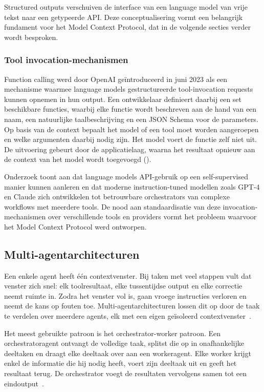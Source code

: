 Structured outputs verschuiven de interface van een language model van vrije tekst naar een getypeerde API. Deze conceptualisering vormt een belangrijk fundament voor het Model Context Protocol, dat in de volgende secties verder wordt besproken.

\subsubsection{Tool invocation-mechanismen}

Function calling werd door OpenAI geïntroduceerd in juni 2023 als een mechanisme waarmee language models gestructureerde tool-invocation requests kunnen opnemen in hun output. Een ontwikkelaar definieert daarbij een set beschikbare functies, waarbij elke functie wordt beschreven aan de hand van een naam, een natuurlijke taalbeschrijving en een JSON Schema voor de parameters. Op basis van de context bepaalt het model of een tool moet worden aangeroepen en welke argumenten daarbij nodig zijn. Het model voert de functie zelf niet uit. De uitvoering gebeurt door de applicatielaag, waarna het resultaat opnieuw aan de context van het model wordt toegevoegd (\cite{schick2023toolformer}).

Onderzoek toont aan dat language models API-gebruik op een self-supervised manier kunnen aanleren en dat moderne instruction-tuned modellen zoals GPT-4 en Claude zich ontwikkelen tot betrouwbare orchestrators van complexe workflows met meerdere tools. De nood aan standaardisatie van deze invocation-mechanismen over verschillende tools en providers vormt het probleem waarvoor het Model Context Protocol werd ontworpen.

\subsection{Multi-agentarchitecturen}\label{subsec:multi-agent}

Een enkele agent heeft één contextvenster. Bij taken met veel stappen vult dat venster zich snel: elk toolresultaat, elke tussentijdse output en elke correctie neemt ruimte in. Zodra het venster vol is, gaan vroege instructies verloren en neemt de kans op fouten toe. Multi-agentarchitecturen lossen dit op door de taak te verdelen over meerdere agents, elk met een eigen geïsoleerd contextvenster~\cite{cemri2025multiagentfail}.

Het meest gebruikte patroon is het orchestrator-worker patroon. Een orchestratoragent ontvangt de volledige taak, splitst die op in onafhankelijke deeltaken en draagt elke deeltaak over aan een workeragent. Elke worker krijgt enkel de informatie die hij nodig heeft, voert zijn deeltaak uit en geeft het resultaat terug. De orchestrator voegt de resultaten vervolgens samen tot een eindoutput~\cite{adimulam2026orchestration}.

